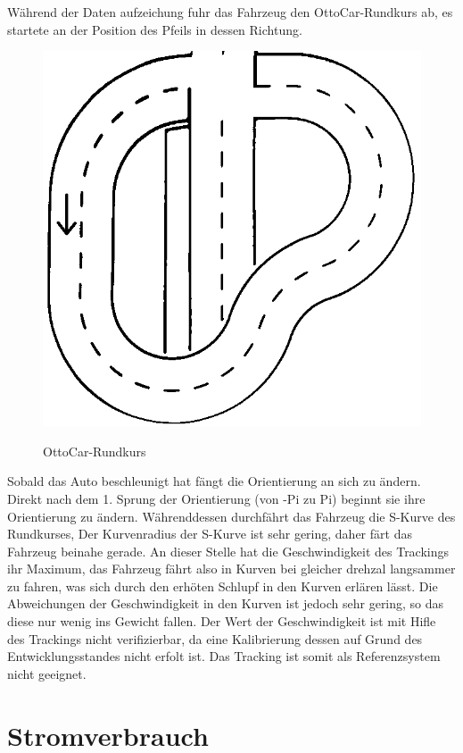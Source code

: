 Während der Daten aufzeichung fuhr das Fahrzeug den OttoCar-Rundkurs ab, es startete  an der Position des Pfeils in dessen Richtung.


\begin{figure}[H]
\centering
\includegraphics[width=.8\textwidth]{Strasse_mono.png}\\
\caption{OttoCar-Rundkurs}%
\label{fig:strasse}
\end{figure}

Sobald das Auto beschleunigt hat fängt die Orientierung an sich zu ändern. Direkt nach dem 1. Sprung der Orientierung (von -Pi zu Pi)
 beginnt sie ihre Orientierung zu ändern. Währenddessen durchfährt das Fahrzeug die S-Kurve des Rundkurses, Der Kurvenradius der S-Kurve ist sehr gering, daher färt das Fahrzeug
 beinahe gerade. An dieser Stelle hat die Geschwindigkeit des Trackings ihr Maximum, das Fahrzeug fährt also in  Kurven bei gleicher drehzal langsammer zu fahren, was sich durch
 den erhöten Schlupf in den Kurven erlären lässt. Die Abweichungen der Geschwindigkeit in den Kurven ist jedoch sehr gering, so das diese nur wenig ins Gewicht fallen.
 Der Wert der Geschwindigkeit ist mit Hifle des Trackings nicht verifizierbar, da eine Kalibrierung dessen auf Grund des Entwicklungsstandes nicht erfolt ist.
 Das Tracking ist somit als Referenzsystem nicht geeignet.
 
 
\section{Stromverbrauch}

